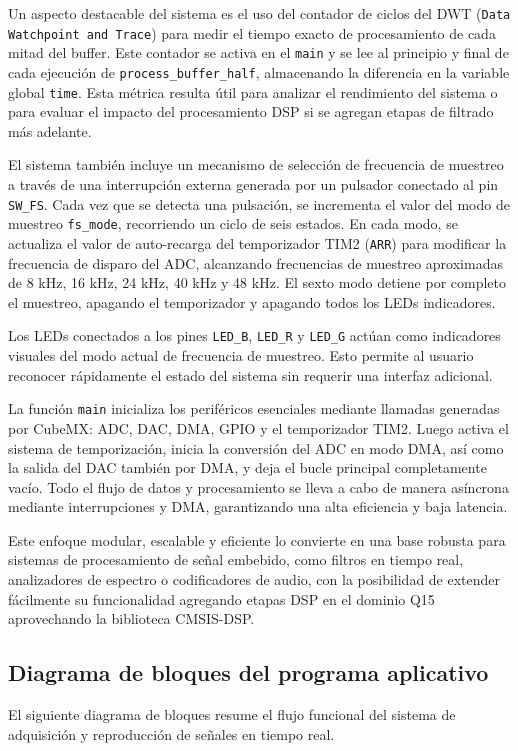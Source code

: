 \documentclass[12pt]{article}
\begin{document}
	Un aspecto destacable del sistema es el uso del contador de ciclos del DWT (\texttt{Data Watchpoint and Trace}) para medir el tiempo exacto de procesamiento de cada mitad del buffer. Este contador se activa en el \texttt{main} y se lee al principio y final de cada ejecución de \texttt{process\_buffer\_half}, almacenando la diferencia en la variable global \texttt{time}. Esta métrica resulta útil para analizar el rendimiento del sistema o para evaluar el impacto del procesamiento DSP si se agregan etapas de filtrado más adelante.
	
	El sistema también incluye un mecanismo de selección de frecuencia de muestreo a través de una interrupción externa generada por un pulsador conectado al pin \texttt{SW\_FS}. Cada vez que se detecta una pulsación, se incrementa el valor del modo de muestreo \texttt{fs\_mode}, recorriendo un ciclo de seis estados. En cada modo, se actualiza el valor de auto-recarga del temporizador TIM2 (\texttt{ARR}) para modificar la frecuencia de disparo del ADC, alcanzando frecuencias de muestreo aproximadas de 8 kHz, 16 kHz, 24 kHz, 40 kHz y 48 kHz. El sexto modo detiene por completo el muestreo, apagando el temporizador y apagando todos los LEDs indicadores.
	
	Los LEDs conectados a los pines \texttt{LED\_B}, \texttt{LED\_R} y \texttt{LED\_G} actúan como indicadores visuales del modo actual de frecuencia de muestreo. Esto permite al usuario reconocer rápidamente el estado del sistema sin requerir una interfaz adicional.
	
	La función \texttt{main} inicializa los periféricos esenciales mediante llamadas generadas por CubeMX: ADC, DAC, DMA, GPIO y el temporizador TIM2. Luego activa el sistema de temporización, inicia la conversión del ADC en modo DMA, así como la salida del DAC también por DMA, y deja el bucle principal completamente vacío. Todo el flujo de datos y procesamiento se lleva a cabo de manera asíncrona mediante interrupciones y DMA, garantizando una alta eficiencia y baja latencia.
	
	Este enfoque modular, escalable y eficiente lo convierte en una base robusta para sistemas de procesamiento de señal embebido, como filtros en tiempo real, analizadores de espectro o codificadores de audio, con la posibilidad de extender fácilmente su funcionalidad agregando etapas DSP en el dominio Q15 aprovechando la biblioteca CMSIS-DSP.
	
	\subsection{Diagrama de bloques del programa aplicativo}
	El siguiente diagrama de bloques resume el flujo funcional del sistema de adquisición y reproducción de señales en tiempo real.
	
\end{document}
